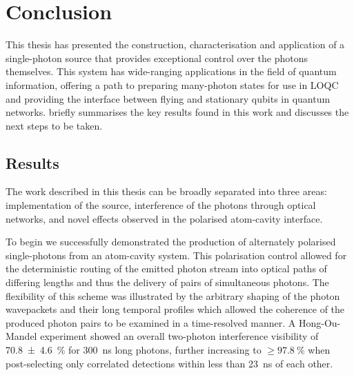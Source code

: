 \documentclass[../Thesis-IJspeert.tex]{subfiles}
\begin{document}
\graphicspath{ {Conclusion/figs/} }

\chapter{Conclusion}
\label{chap:Conclusion}

\iffalse
This thesis has presented the construction, characterisation and application of a single-photon source that provides exceptional control over the photons themselves.  This system has wide-ranging applications in the field of quantum information, offering a path to preparing many-photon states for use in LOQC and providing the interface between flying and stationary qubits in quantum networks.   briefly summarises the key results found in this work and  discusses the next steps to be taken.
\pagebreak
\section{Results}
\label{sec:results}

The work described in this thesis can be broadly separated into three areas: implementation of the source, interference of the photons through optical networks, and novel effects observed in the polarised atom-cavity interface.

To begin we successfully demonstrated the production of alternately polarised single-photons from an atom-cavity system.  This polarisation control allowed for the deterministic routing of the emitted photon stream into optical paths of differing lengths and thus the delivery of pairs of simultaneous photons.  The flexibility of this scheme was illustrated by the arbitrary shaping of the photon wavepackets and their long temporal profiles which allowed the coherence of the produced photon pairs to be examined in a time-resolved manner.  A Hong-Ou-Mandel experiment showed an overall two-photon interference visibility of \SI{70.8\pm4.6}{\percent} for \SI{300}{\ns} long photons, further increasing to $\geq\SI{97.8}{\percent}$ when post-selecting only correlated detections within less than \SI{23}{\ns} of each other.
\end{document}
